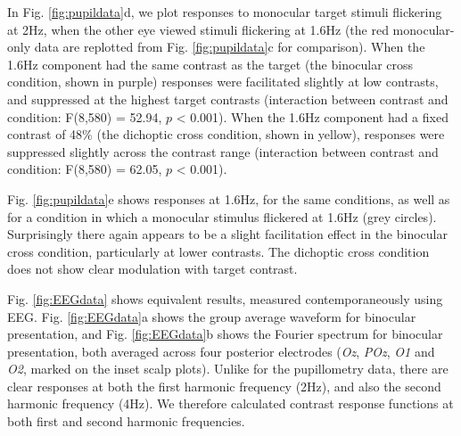 \documentclass[
]{article}
\begin{document}
In Fig. \ref{fig:pupildata}d, we plot responses to monocular target stimuli flickering at 2Hz, when the other eye viewed stimuli flickering at 1.6Hz (the red monocular-only data are replotted from Fig. \ref{fig:pupildata}c for comparison). When the 1.6Hz component had the same contrast as the target (the binocular cross condition, shown in purple) responses were facilitated slightly at low contrasts, and suppressed at the highest target contrasts (interaction between contrast and condition: F(8,580) = 52.94, \(p\) \textless{} 0.001). When the 1.6Hz component had a fixed contrast of 48\% (the dichoptic cross condition, shown in yellow), responses were suppressed slightly across the contrast range (interaction between contrast and condition: F(8,580) = 62.05, \(p\) \textless{} 0.001).

Fig. \ref{fig:pupildata}e shows responses at 1.6Hz, for the same conditions, as well as for a condition in which a monocular stimulus flickered at 1.6Hz (grey circles). Surprisingly there again appears to be a slight facilitation effect in the binocular cross condition, particularly at lower contrasts. The dichoptic cross condition does not show clear modulation with target contrast.

Fig. \ref{fig:EEGdata} shows equivalent results, measured contemporaneously using EEG. Fig. \ref{fig:EEGdata}a shows the group average waveform for binocular presentation, and Fig. \ref{fig:EEGdata}b shows the Fourier spectrum for binocular presentation, both averaged across four posterior electrodes (\emph{Oz}, \emph{POz}, \emph{O1} and \emph{O2}, marked on the inset scalp plots). Unlike for the pupillometry data, there are clear responses at both the first harmonic frequency (2Hz), and also the second harmonic frequency (4Hz). We therefore calculated contrast response functions at both first and second harmonic frequencies.
\end{document}
